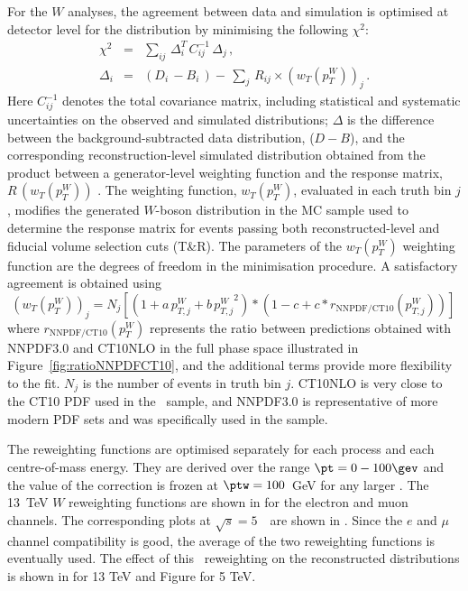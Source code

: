 For the $W$ analyses, the agreement between data and
simulation is optimised at detector level for the \ut distribution by
minimising the following $\chi^2$:
\begin{eqnarray}
  \chi^2  &=&  \sum_{ij} \, \Delta^T_i \, C^{-1}_{ij} \, \Delta_j \,   \label{eqX2}
 ,\\
  \Delta_i  &=& ( D_i \, - B_i \,) - \, \sum_{j} \, R_{ij} \times (w_{T}(p_{T}^{W}))_j \, .
\end{eqnarray}
Here $C^{-1}_{ij}$ denotes the total covariance matrix, including statistical and systematic uncertainties on the observed and simulated \ut distributions;
 $\Delta$ is the difference between the background-subtracted data distribution, ($D-B$), and the corresponding reconstruction-level simulated distribution obtained from the product between a generator-level weighting function and the response matrix, $R \, (w_{T}(p_{T}^{W}))$ .
The weighting function, $ w_{T}(p_{T}^{W}) $, evaluated in each truth bin $j$, modifies the generated $W$-boson \pt
distribution in the MC sample used to determine the response matrix for events passing both reconstructed-level and
fiducial volume selection cuts (T\&R).
 The parameters of the $w_{T}(p_{T}^{W})$ weighting function are the degrees of freedom in the minimisation procedure. A satisfactory agreement is obtained using
\begin{equation}
(w_{T}(p_{T}^{W}))_j  = N_j \left[\left(1 + a \, p_{T, j}^{W} + b \, {p_{T, j}^{W}}^2
\right)*\left(1-c+c*r_\mathrm{NNPDF/CT10}(p_{T, j}^{W})\right)\right] \,    \label{eq:Wnom_bin}
\end{equation}
where $r_\mathrm{NNPDF/CT10}(p_{T}^{W})$ represents the ratio between predictions obtained with NNPDF3.0 and CT10NLO in
the full phase space illustrated in Figure~\ref{fig:ratioNNPDFCT10}, and the additional terms provide more flexibility
to the fit. $N_{j}$ is the number of events in truth bin $j$. CT10NLO is very close to the CT10 PDF used in the \POWHEG\ sample, and NNPDF3.0 is representative of more modern PDF sets and was specifically used in the \Sherpa sample. 

The reweighting functions are optimised separately for each process and each centre-of-mass energy. They are derived over the range $\pt = 0 - 100 \gev$ and the value of the correction is frozen at $\ptw=100$~GeV for any larger \pt. The 13~TeV $W$ reweighting functions are shown in  for the electron and muon channels. The corresponding plots at $\sqrt{s} = 5$~\TeV\ are shown in  . Since the $e$ and $\mu$ channel compatibility is good, the average of the two reweighting functions is eventually used.
The effect of this \pt\ reweighting on the reconstructed \ut distributions is shown in   for 13 TeV and Figure   for 5 TeV.


